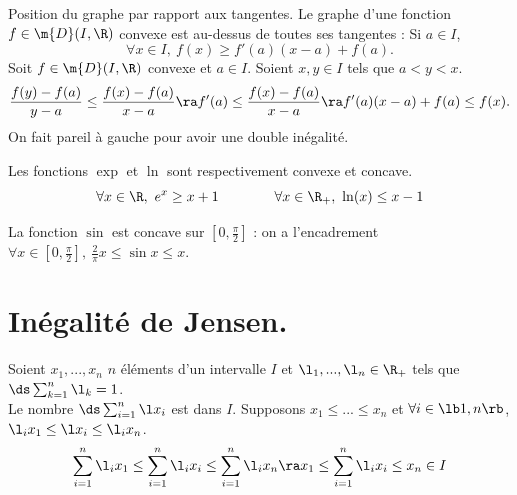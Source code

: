 \documentclass[11pt]{article}
\begin{document}
\begin{prop}{Position du graphe par rapport aux tangentes.}{}
    Le graphe d'une fonction $f\in\m{D}(I,\R)$ convexe est au-dessus de toutes ses tangentes : Si $a\in I$,
    \begin{equation*}
        \forall x \in I, ~ f(x) \geq f'(a)(x-a)+f(a).
    \end{equation*}
    \tcblower
    Soit $f\in\m{D}(I,\R)$ convexe et $a\in I$. Soient $x,y\in I$ tels que $a<y<x$.
    \begin{equation*}
        \frac{f(y)-f(a)}{y-a} \leq \frac{f(x)-f(a)}{x-a} \ra f'(a) \leq \frac{f(x)-f(a)}{x-a}\ra f'(a)(x-a)+f(a)\leq f(x).
    \end{equation*}
    On fait pareil à gauche pour avoir une double inégalité.
\end{prop}

\begin{ex}{}{}
    Les fonctions $\exp$ et $\ln$ sont respectivement convexe et concave.
    \begin{equation*}
        \forall x \in \R, ~ e^x \geq x + 1 \qquad\qquad \forall x \in \R_+, ~ \ln(x) \leq x-1
    \end{equation*}
\end{ex}

\begin{ex}{}{}
    La fonction $\sin$ est concave sur $[0,\frac{\pi}{2}]$ : on a l'encadrement $\forall x \in [0,\frac{\pi}{2}], ~ \frac{2}{\pi}x \leq \sin x \leq x$.  
\end{ex}

\section{Inégalité de Jensen.}

\begin{lemme}{}{}
    Soient $x_1,...,x_n$ $n$ éléments d'un intervalle $I$ et $\l_1,...,\l_n\in\R_+$ tels que $\ds\sum_{k=1}^n\l_k=1$.\\
    Le nombre $\ds\sum_{i=1}^n\l x_i$ est dans $I$.
    \tcblower
    Supposons $x_1\leq...\leq x_n$ et $\forall i \in \lb1,n\rb$, $\l_i x_1 \leq \l x_i \leq \l_i x_n$.
    \begin{equation*}
        \sum_{i=1}^n\l_ix_1 \leq \sum_{i=1}^n\l_ix_i \leq \sum_{i=1}^n\l_ix_n \ra x_1 \leq \sum_{i=1}^n\l_ix_i \leq x_n \in I
    \end{equation*}
\end{lemme}
\end{document}
